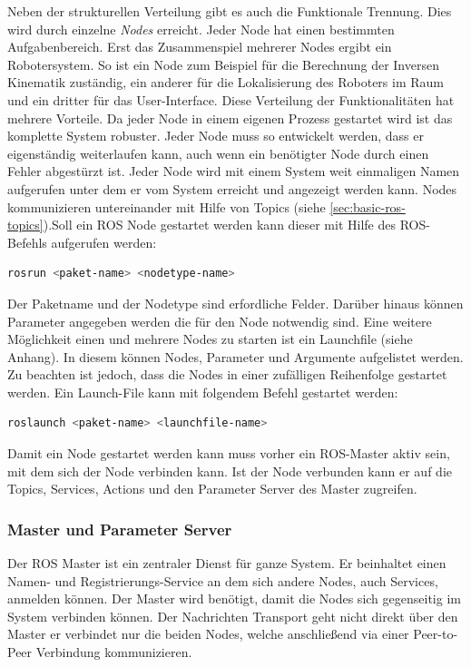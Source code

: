 Neben der strukturellen Verteilung gibt es auch die Funktionale Trennung. Dies wird durch einzelne \textit{Nodes} erreicht. Jeder Node hat einen bestimmten Aufgabenbereich. Erst das Zusammenspiel mehrerer Nodes ergibt ein Robotersystem. So ist ein Node zum Beispiel für die Berechnung der Inversen Kinematik zuständig, ein anderer für die Lokalisierung des Roboters im Raum und ein dritter für das User-Interface. Diese Verteilung der Funktionalitäten hat mehrere Vorteile. Da jeder Node in einem eigenen Prozess gestartet wird ist das komplette System robuster. Jeder Node muss so entwickelt werden, dass er eigenständig weiterlaufen kann, auch wenn ein benötigter Node durch einen Fehler abgestürzt ist. Jeder Node wird mit einem System weit einmaligen Namen aufgerufen unter dem er vom System erreicht und angezeigt werden kann. Nodes kommunizieren untereinander mit Hilfe von Topics (siehe \ref{sec:basic-ros-topics}).Soll ein ROS Node gestartet werden kann dieser mit Hilfe des ROS-Befehls aufgerufen werden:

\begin{lstlisting}[language=bash]
rosrun <paket-name> <nodetype-name>
\end{lstlisting}

Der Paketname und der Nodetype sind erfordliche Felder. Darüber hinaus können Parameter angegeben werden die für den Node notwendig sind. Eine weitere Möglichkeit einen und mehrere Nodes zu starten ist ein Launchfile (siehe Anhang). In diesem können Nodes, Parameter und Argumente aufgelistet werden. Zu beachten ist jedoch, dass die Nodes in einer zufälligen Reihenfolge gestartet werden. Ein Launch-File kann mit folgendem Befehl gestartet werden:

\begin{lstlisting}[language=bash]
roslaunch <paket-name> <launchfile-name>
\end{lstlisting}

Damit ein Node gestartet werden kann muss vorher ein ROS-Master aktiv sein, mit dem sich der Node verbinden kann. Ist der Node verbunden kann er auf die Topics, Services, Actions und den Parameter Server des Master zugreifen.

\subsubsection{Master und Parameter Server}
Der ROS Master ist ein zentraler Dienst für ganze System. Er beinhaltet einen Namen- und Registrierungs-Service an dem sich andere Nodes, auch Services, anmelden können. Der Master wird benötigt, damit die Nodes sich gegenseitig im System verbinden können. Der Nachrichten Transport geht nicht direkt über den Master er verbindet nur die beiden Nodes, welche anschließend via einer Peer-to-Peer Verbindung kommunizieren.

